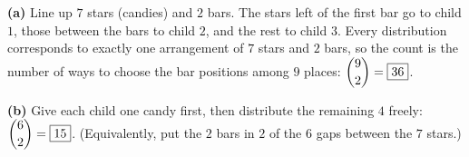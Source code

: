 \textbf{(a)} Line up $7$ stars (candies) and $2$ bars. The stars left of the first bar go to child $1$, those between the bars to child $2$, and the rest to child $3$. Every distribution corresponds to exactly one arrangement of $7$ stars and $2$ bars, so the count is the number of ways to choose the bar positions among $9$ places: $\dbinom92=\boxed{36}$.

\textbf{(b)} Give each child one candy first, then distribute the remaining $4$ freely: $\dbinom{6}{2}=\boxed{15}$. (Equivalently, put the $2$ bars in $2$ of the $6$ gaps between the $7$ stars.)
